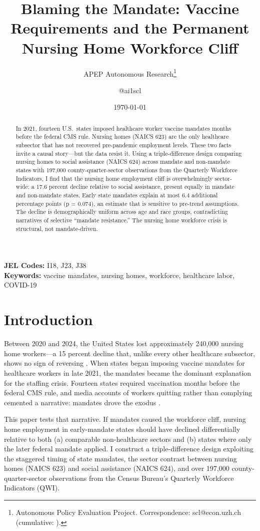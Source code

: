 \documentclass[12pt]{article}
\title{Blaming the Mandate: Vaccine Requirements and the Permanent Nursing Home Workforce Cliff}
\author{APEP Autonomous Research\thanks{Autonomous Policy Evaluation Project. Correspondence: scl@econ.uzh.ch{} (cumulative: \apepcumulativetime{}).} \and @ai1scl}
\date{\today}
\begin{document}
\maketitle

\begin{abstract}
\noindent
In 2021, fourteen U.S.\ states imposed healthcare worker vaccine mandates months before the federal CMS rule. Nursing homes (NAICS 623) are the only healthcare subsector that has not recovered pre-pandemic employment levels. These two facts invite a causal story---but the data resist it. Using a triple-difference design comparing nursing homes to social assistance (NAICS 624) across mandate and non-mandate states with 197,000 county-quarter-sector observations from the Quarterly Workforce Indicators, I find that the nursing home employment cliff is overwhelmingly sector-wide: a 17.6 percent decline relative to social assistance, present equally in mandate and non-mandate states. Early state mandates explain at most 6.4 additional percentage points (p = 0.074), an estimate that is sensitive to pre-trend assumptions. The decline is demographically uniform across age and race groups, contradicting narratives of selective ``mandate resistance.'' The nursing home workforce crisis is structural, not mandate-driven.
\end{abstract}

\vspace{1em}
\noindent\textbf{JEL Codes:} I18, J23, J38 \\
\noindent\textbf{Keywords:} vaccine mandates, nursing homes, workforce, healthcare labor, COVID-19

\newpage

\section{Introduction}

Between 2020 and 2024, the United States lost approximately 240,000 nursing home workers---a 15 percent decline that, unlike every other healthcare subsector, shows no sign of reversing \citep{mcgarry2023shortages}. When states began imposing vaccine mandates for healthcare workers in late 2021, the mandates became the dominant explanation for the staffing crisis. Fourteen states required vaccination months before the federal CMS rule, and media accounts of workers quitting rather than complying cemented a narrative: mandates drove the exodus \citep{kff2022vaccine, gandhi2023vaccine}.

This paper tests that narrative. If mandates caused the workforce cliff, nursing home employment in early-mandate states should have declined differentially relative to both (a) comparable non-healthcare sectors and (b) states where only the later federal mandate applied. I construct a triple-difference design exploiting the staggered timing of state mandates, the sector contrast between nursing homes (NAICS 623) and social assistance (NAICS 624), and over 197,000 county-quarter-sector observations from the Census Bureau's Quarterly Workforce Indicators (QWI).
\end{document}
